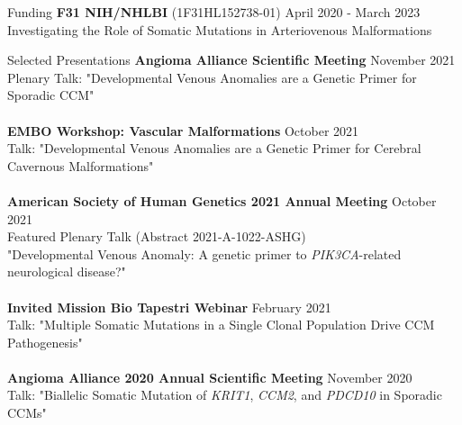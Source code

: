\documentclass{resume} %
\begin{document}
\begin{rSection}{Funding}
{\bf F31 NIH/NHLBI  }{(1F31HL152738-01)}  \hfill {April 2020 - March 2023}\\
Investigating the Role of Somatic Mutations in Arteriovenous Malformations\\
\end{rSection}


\begin{rSection}{Selected Presentations}
{\bf Angioma Alliance Scientific Meeting} \hfill {November  2021}\\
Plenary Talk: "Developmental Venous Anomalies are a Genetic Primer for Sporadic CCM"\\\\
{\bf EMBO Workshop: Vascular Malformations} \hfill {October  2021}\\
Talk: "Developmental Venous Anomalies are a Genetic Primer for Cerebral Cavernous Malformations"\\\\
{\bf American Society of Human Genetics 2021 Annual Meeting} \hfill {October  2021}\\
Featured Plenary Talk (Abstract 2021-A-1022-ASHG) \\ "Developmental Venous Anomaly: A genetic primer to \textit{PIK3CA}-related neurological disease?"\\\\
{\bf Invited Mission Bio Tapestri Webinar} \hfill {February  2021}\\
Talk: "Multiple Somatic Mutations in a Single Clonal Population Drive CCM Pathogenesis"\\\\
{\bf Angioma Alliance 2020 Annual Scientific Meeting} \hfill {November 2020}\\
Talk: "Biallelic Somatic Mutation of \textit{KRIT1}, \textit{CCM2}, and \textit{PDCD10} in Sporadic CCMs"\\\\

\end{rSection}
\end{document}
